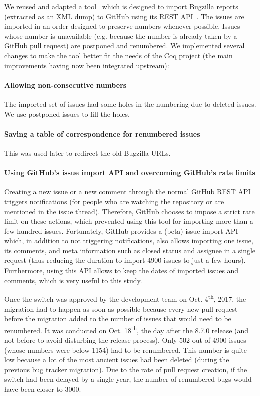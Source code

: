 \documentclass[conference]{IEEEtran}
\begin{document}
We reused and adapted a tool~\cite{bugzilla2github} which is designed to import Bugzilla reports (extracted as an XML dump) to GitHub using its REST API~\cite{github_REST_API}. The issues are imported in an order designed to preserve numbers whenever possible. Issues whose number is unavailable (e.g. because the number is already taken by a GitHub pull request) are postponed and renumbered. We implemented several changes to make the tool better fit the needs of the Coq project (the main improvements having now been integrated upstream):

\paragraph{Allowing non-consecutive numbers} The imported set of issues had some holes in the numbering due to deleted issues. We use postponed issues to fill the holes.
\paragraph{Saving a table of correspondence for renumbered issues} This was used later to redirect the old Bugzilla URLs.
\paragraph{Using GitHub's issue import API and overcoming GitHub's rate limits} Creating a new issue or a new comment through the normal GitHub REST API triggers notifications (for people who are watching the repository or are mentioned in the issue thread). Therefore, GitHub chooses to impose a strict rate limit on these actions, which prevented using this tool for importing more than a few hundred issues. Fortunately, GitHub provides a (beta) issue import API which, in addition to not triggering notifications, also allows importing one issue, its comments, and meta information such as closed status and assignee in a single request (thus reducing the duration to import 4900 issues to just a few hours). Furthermore, using this API allows to keep the dates of imported issues and comments, which is very useful to this study.

Once the switch was approved by the development team on Oct. 4\textsuperscript{th}, 2017, the migration had to happen as soon as possible because every new pull request before the migration added to the number of issues that would need to be renumbered. It was conducted
on Oct. 18\textsuperscript{th},  the day after the 8.7.0 release (and not before to avoid disturbing the release process). Only 502 out of 4900 issues (whose numbers were below 1154) had to be renumbered. This number is quite low because a lot of the most ancient issues had been deleted (during the previous bug tracker migration).
Due to the rate of pull request creation, if the switch had been delayed by a single year, the number of renumbered bugs would have been closer to 3000.
\end{document}
